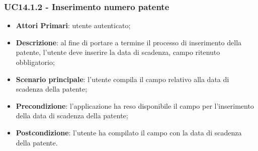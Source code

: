 \subsubsection{UC14.1.2 - Inserimento numero patente}
\begin{itemize}
	\item \textbf{Attori Primari}: utente autenticato;
	\item \textbf{Descrizione}: al fine di portare a termine il processo di inserimento della patente, l'utente deve inserire la data di scadenza, campo ritenuto obbligatorio; 
	\item \textbf{Scenario principale}: l'utente compila il campo relativo alla data di scadenza della patente;	
	\item \textbf{Precondizione}: l'applicazione ha reso disponibile il campo per l'inserimento della data di scadenza della patente;
	\item \textbf{Postcondizione}: l'utente ha compilato il campo con la data di scadenza della patente.
\end{itemize}
